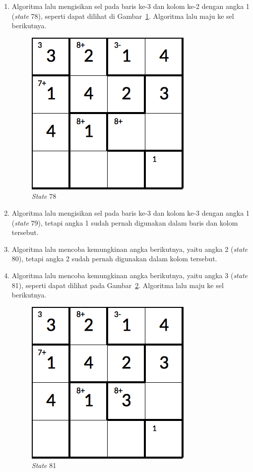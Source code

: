 \begin{enumerate}
\item Algoritma lalu mengisikan sel pada baris ke-3 dan kolom ke-2 dengan angka 1 (\textit{state} 78), seperti dapat dilihat di Gambar~\ref{fig:lampiranbt26}. Algoritma lalu maju ke sel berikutnya.

\begin{figure}
\centering
\captionsetup{justification=centering}
\includegraphics[scale=0.333]{Gambar/backtracking/State78}
\caption[\textit{State} 78]{\textit{State} 78}
\label{fig:lampiranbt26}
\end{figure}

\item Algoritma lalu mengisikan sel pada baris ke-3 dan kolom ke-3 dengan angka 1 (\textit{state} 79), tetapi angka 1 sudah pernah digunakan dalam baris dan kolom tersebut.
\item Algoritma lalu mencoba kemungkinan angka berikutnya, yaitu angka 2 (\textit{state} 80), tetapi angka 2 sudah pernah digunakan dalam kolom tersebut.
\item Algoritma lalu mencoba kemungkinan angka berikutnya, yaitu angka 3 (\textit{state} 81), seperti dapat dilihat pada Gambar~\ref{fig:lampiranbt27}. Algoritma lalu maju ke sel berikutnya.

\begin{figure}
\centering
\captionsetup{justification=centering}
\includegraphics[scale=0.333]{Gambar/backtracking/State81}
\caption[\textit{State} 81]{\textit{State} 81}
\label{fig:lampiranbt27}
\end{figure}


\end{enumerate}
